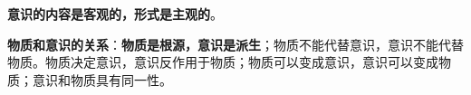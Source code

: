 \textbf{{意识的内容是客观的，形式是主观的}}{。}

\textbf{{物质和意识的关系}}{：}\textbf{{物质是根源，意识是派生}}{；物质不能代替意识，意识不能代替物质。物质决定意识，意识反作用于物质；物质可以变成意识，意识可以变成物质；意识和物质具有同一性。}

